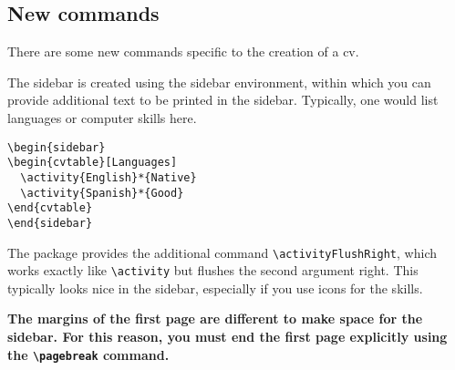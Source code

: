 \documentclass{article}
\begin{document}
\subsection{New commands}
There are some new commands specific to the creation of a cv.

The sidebar is created using the sidebar environment, within which you can provide additional text to be printed in the sidebar.
Typically, one would list languages or computer skills here.
\begin{verbatim}
\begin{sidebar}
\begin{cvtable}[Languages]
  \activity{English}*{Native}
  \activity{Spanish}*{Good}
\end{cvtable}
\end{sidebar}
\end{verbatim}
The package provides the additional command \texttt{\textbackslash{}activityFlushRight}, which works exactly like \texttt{\textbackslash{}activity} but flushes the second argument right.
This typically looks nice in the sidebar, especially if you use icons for the skills.

\textbf{The margins of the first page are different to make space for the sidebar.
For this reason, you must end the first page explicitly using the \texttt{\textbackslash{}pagebreak} command.}
\end{document}
